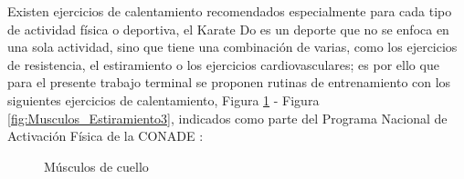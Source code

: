 Existen ejercicios de calentamiento recomendados especialmente para cada tipo de actividad física o deportiva, el Karate Do es un deporte que no se enfoca en una sola actividad, sino que tiene una combinación de varias, como los ejercicios de resistencia, el estiramiento o los ejercicios cardiovasculares; es por ello que para el presente trabajo terminal se proponen rutinas de entrenamiento con los siguientes ejercicios de calentamiento, Figura \ref{fig:Musculos_Cuello} - Figura \ref{fig:Musculos_Estiramiento3}, indicados como parte del Programa Nacional de Activación Física de la CONADE \cite{CONADE}:

\clearpage

\begin{figure}[H]
	\centering
	\caption{Músculos de cuello}
	\label{fig:Musculos_Cuello}
\end{figure}


